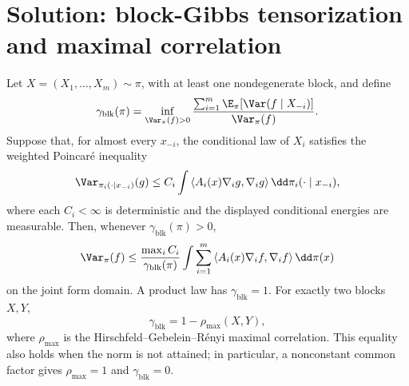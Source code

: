\documentclass[../main.tex]{subfiles}
\begin{document}

\section*{Solution: block-Gibbs tensorization and maximal correlation}
\label{sec:sol-thm-a3-block-gibbs}

\begin{theorem}
\label{thm:sol-a3-block-gibbs}
Let $X=(X_1,\ldots,X_m)\sim\pi$, with at least one nondegenerate block, and define
\[
 \gamma_{\mathrm{blk}}(\pi)
 =\inf_{\Var_\pi(f)>0}
   \frac{\sum_{i=1}^m\E_\pi[\Var(f\mid X_{-i})]}{\Var_\pi(f)}.
\]
Suppose that, for almost every $x_{-i}$, the conditional law of $X_i$ satisfies the weighted
Poincar\'e inequality
\[
 \Var_{\pi_i(\cdot\mid x_{-i})}(g)
 \le C_i\int
 \left\langle A_i(x)\nabla_i g,\nabla_i g\right\rangle
 \dd\pi_i(\cdot\mid x_{-i}),
\]
where each $C_i<\infty$ is deterministic and the displayed conditional energies are measurable.
Then, whenever $\gamma_{\mathrm{blk}}(\pi)>0$,
\[
 \Var_\pi(f)
 \le\frac{\max_iC_i}{\gamma_{\mathrm{blk}}(\pi)}
 \int\sum_{i=1}^m
 \left\langle A_i(x)\nabla_i f,\nabla_i f\right\rangle\dd\pi(x)
\]
on the joint form domain.  A product law has $\gamma_{\mathrm{blk}}=1$.  For exactly two
blocks $X,Y$,
\[
 \gamma_{\mathrm{blk}}=1-\rho_{\max}(X,Y),
\]
where $\rho_{\max}$ is the Hirschfeld--Gebelein--R\'enyi maximal correlation.  This equality
also holds when the norm is not attained; in particular, a nonconstant common factor gives
$\rho_{\max}=1$ and $\gamma_{\mathrm{blk}}=0$.
\end{theorem}
\end{document}

